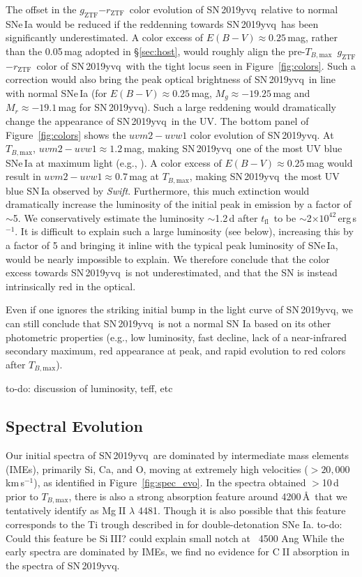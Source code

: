 \documentclass[twocolumn]{aastex63}
\def\ion#1#2{#1$\;${\footnotesize\rm{#2}}\relax}
\newcommand{\todo}[1]{{\color{magenta} to-do: {#1}}}
\newcommand{\rztf}{$r_\mathrm{ZTF}$}
\newcommand{\gztf}{$g_\mathrm{ZTF}$}
\newcommand{\tfl}{$t_\mathrm{fl}$}
\newcommand{\tbmax}{$T_{B,\mathrm{max}}$}
\newcommand{\kms}{km\,s$^{-1}$}
\newcommand{\sn}{SN\,2019yvq}
\begin{document}
The offset in the \gztf$ - $\rztf\ color evolution of \sn\ relative to normal
SNe\,Ia would be reduced if the reddenning towards \sn\ has been
significantly underestimated. A color excess of $E(B-V) \approx 0.25$\,mag,
rather than the 0.05\,mag adopted in \S\ref{sec:host}, would roughly align
the pre-\tbmax\ \gztf$ - $\rztf\ color of \sn\ with the tight locus seen in
Figure~\ref{fig:colors}. Such a correction would also bring the peak optical
brightness of \sn\ in line with normal SNe\,Ia (for $E(B-V) \approx
0.25$\,mag, $M_g \approx -19.25$\,mag and $M_r \approx -19.1$\,mag for \sn).
Such a large reddening would dramatically change the appearance of \sn\ in
the UV. The bottom panel of Figure~\ref{fig:colors} shows the $uvm2 - uvw1$
color evolution of \sn. At \tbmax, $uvm2 - uvw1 \approx 1.2$\,mag, making
\sn\ one of the most UV blue SNe\,Ia at maximum light (e.g.,
\citealt{Milne10,Brown17}). A color excess of $E(B-V) \approx 0.25$\,mag
would result in $uvm2 - uvw1 \approx 0.7$\,mag at \tbmax, making \sn\ the
most UV blue SN\,Ia observed by \textit{Swift}. Furthermore, this much
extinction would dramatically increase the luminosity of the initial peak in
emission by a factor of $\sim$5. We conservatively estimate the luminosity
$\sim$1.2\,d after \tfl\ to be $\sim$2$\times 10^{42}$\,erg\,s$^{-1}$. It is
difficult to explain such a large luminosity (see below), increasing this by
a factor of 5 and bringing it inline with the typical peak luminosity of
SNe\,Ia, would be nearly impossible to explain. We therefore conclude that
the color excess towards \sn\ is not underestimated, and that the SN is
instead intrinsically red in the optical.

Even if one ignores the striking initial bump in the light curve of \sn, we
can still conclude that \sn\ is not a normal SN Ia based on its other
photometric properties (e.g., low luminosity, fast decline, lack of a
near-infrared secondary maximum, red appearance at peak, and rapid evolution
to red colors after \tbmax).

\todo{discussion of luminosity, teff, etc}

\subsection{Spectral Evolution}\label{sec:spec}

Our initial spectra of \sn\ are dominated by intermediate mass elements
(IMEs), primarily Si, Ca, and O, moving at extremely high velocities ($>
20,000$\,\kms), as identified in Figure~\ref{fig:spec_evo}. In the spectra
obtained $>$10\,d prior to \tbmax, there is also a strong absorption feature
around 4200\,\AA\ that we tentatively identify as \ion{Mg}{II} $\lambda$ 4481.
Though it is also possible that this feature corresponds to the Ti trough
described in \citet{Polin19} for double-detonation SNe Ia. \todo{Could this
feature be \ion{Si}{III}? could explain small notch at ~4500 Ang} While the
early spectra are dominated by IMEs, we find no evidence for \ion{C}{II}
absorption in the spectra of \sn.
\end{document}
